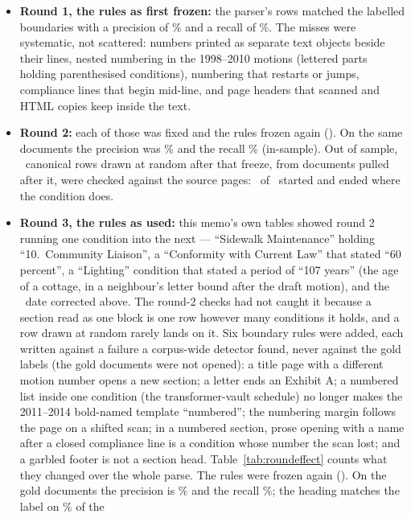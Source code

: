 \documentclass[11pt]{article}
\begin{document}
\begin{itemize}
\item \textbf{Round 1, the rules as first frozen:} the parser's rows matched the labelled
boundaries with a precision of \ccValRoneInPrec\% and a recall of \ccValRoneInRecall\%. The
misses were systematic, not scattered: numbers printed as separate text objects beside their
lines, nested numbering in the 1998--2010 motions (lettered parts holding parenthesised
conditions), numbering that restarts or jumps, compliance lines that begin mid-line, and page
headers that scanned and HTML copies keep inside the text.
\item \textbf{Round 2:} each of those was fixed and the rules frozen again (\ccValRtwoFrozen). On
the same documents the precision was \ccValRtwoInPrec\% and the recall \ccValRtwoInRecall\%
(in-sample). Out of sample, \ccValRtwoOutRows\ canonical rows drawn at random after that freeze,
from documents pulled after it, were checked against the source pages: \ccValRtwoOutCorrect\ of
\ccValRtwoOutRows\ started and ended where the condition does.
\item \textbf{Round 3, the rules as used:} this memo's own tables showed round 2 running one
condition into the next --- ``Sidewalk Maintenance'' holding ``10.~Community Liaison'', a
``Conformity with Current Law'' that stated ``60 percent'', a ``Lighting'' condition that stated
a period of ``107 years'' (the age of a cottage, in a neighbour's letter bound after the draft
motion), and the \ccRprevEarliestInUniverse\ date corrected above. The round-2 checks had not caught it because a
section read as one block is one row however many conditions it holds, and a row drawn at
random rarely lands on it. Six boundary rules were added, each written against a failure a
corpus-wide detector found, never against the gold labels (the gold documents were not opened):
a title page with a different motion number opens a new section; a letter ends an Exhibit A;
a numbered list inside one condition (the transformer-vault schedule) no longer makes the
2011--2014 bold-named template ``numbered''; the numbering margin follows the page on a
shifted scan; in a numbered section, prose opening with a name after a closed compliance line
is a condition whose number the scan lost; and a garbled footer is not a section head.
Table~\ref{tab:roundeffect} counts what they changed over the whole parse. The rules were
frozen again (\ccValFrozen). On the gold documents the precision is \ccValInPrec\% and the
recall \ccValInRecall\%; the heading matches the label on \ccValInHead\% of the \ccValInHeadN\

\end{itemize}
\end{document}
